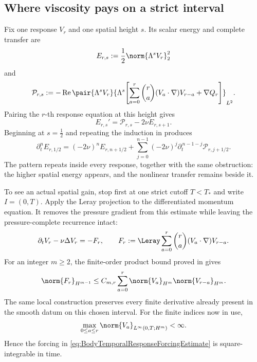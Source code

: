 \subsection{Where viscosity pays on a strict interval}\label{sub:SobolevRegularityInsideEveryCompletedRow}

Fix one response \(V_r\) and one spatial height \(s\).  Its scalar energy and
complete transfer are
\[
  E_{r,s}:=\frac12\norm{\Lambda^sV_r}_2^2
\]
and
\[
  \mathcal P_{r,s}
  :=-
  \operatorname{Re}
  \pair{\Lambda^sV_r}
  {\Lambda^s\!\left[
    \sum_{a=0}^{r}\binom{r}{a}(V_a\cdot\nabla)V_{r-a}
    +\nabla Q_r
  \right]}_{L^2}.
\]
Pairing the \(r\)-th response equation at this height gives
\begin{equation}\label{eq:BodyEveryTemporalRowSpatialEnergy}
  E_{r,s}'=\mathcal P_{r,s}-2\nu E_{r,s+1}.
\end{equation}
Beginning at \(s=\tfrac12\) and repeating the induction in
 produces
\begin{equation}\label{eq:BodyEveryTemporalRowCompletedHeight}
  \partial_t^nE_{r,1/2}
  =(-2\nu)^nE_{r,n+1/2}
  +\sum_{j=0}^{n-1}
  (-2\nu)^j
  \partial_t^{\,n-1-j}\mathcal P_{r,j+1/2}.
\end{equation}
The pattern repeats inside every response, together with the same obstruction:
the higher spatial energy appears, and the nonlinear transfer remains beside
it.

To see an actual spatial gain, stop first at one strict cutoff
\(T<T_*\) and write \(I=(0,T)\).  Apply the Leray projection to the
differentiated momentum equation.  It removes the pressure gradient from this
estimate while leaving the pressure-complete recurrence intact:
\[
  \partial_tV_r-\nu\Delta V_r=-F_r,
  \qquad
  F_r:=\Leray\sum_{a=0}^{r}\binom{r}{a}(V_a\cdot\nabla)V_{r-a}.
\]
For an integer \(m\geq2\), the finite-order product bound proved in
 gives
\begin{equation}\label{eq:BodyTemporalResponseForcingEstimate}
  \norm{F_r}_{H^{m-1}}
  \leq
  C_{m,r}\sum_{a=0}^{r}
  \norm{V_a}_{H^m}\norm{V_{r-a}}_{H^m}.
\end{equation}
The same local construction preserves every
finite derivative already present in the smooth datum on this chosen interval.
For the finite indices now in use,
\begin{equation}\label{eq:BodyStrictIntervalResponseBound}
  \max_{0\leq a\leq r}
  \norm{V_a}_{L^\infty(0,T;H^m)}<\infty.
\end{equation}
Hence the forcing in
\eqref{eq:BodyTemporalResponseForcingEstimate} is square-integrable in time.

